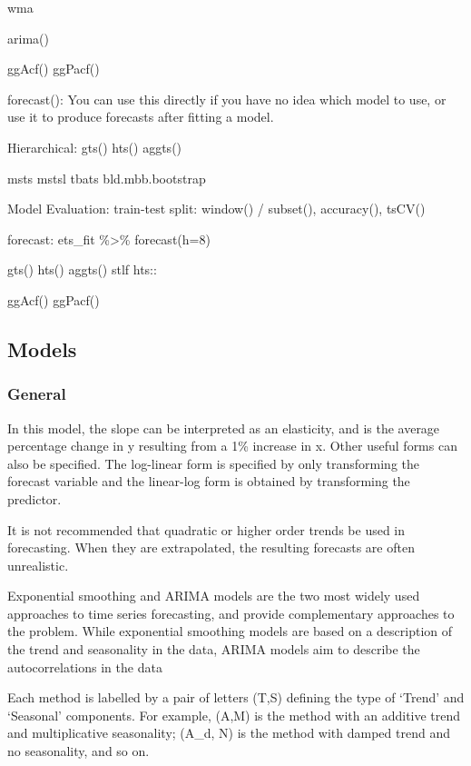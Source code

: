 \documentclass[]{book}
\begin{document}
wma

arima()

ggAcf() \textbar{} ggPacf()

forecast(): You can use this directly if you have no idea which model to
use, or use it to produce forecasts after fitting a model.

Hierarchical: gts() \textbar{} hts() \textbar{} aggts()

msts \textbar{} mstsl \textbar{} tbats \textbar{} bld.mbb.bootstrap

Model Evaluation: train-test split: window() / subset(), accuracy(),
tsCV()

forecast: ets\_fit \%\textgreater{}\% forecast(h=8)

gts() \textbar{} hts() \textbar{} aggts() \textbar{} stlf \textbar{}
hts::

ggAcf() \textbar{} ggPacf()

\subsection{Models}\label{models}

\subsubsection{General}\label{general-8}

In this model, the slope can be interpreted as an elasticity, and is the
average percentage change in y resulting from a 1\% increase in x. Other
useful forms can also be specified. The log-linear form is specified by
only transforming the forecast variable and the linear-log form is
obtained by transforming the predictor.

It is not recommended that quadratic or higher order trends be used in
forecasting. When they are extrapolated, the resulting forecasts are
often unrealistic.

Exponential smoothing and ARIMA models are the two most widely used
approaches to time series forecasting, and provide complementary
approaches to the problem. While exponential smoothing models are based
on a description of the trend and seasonality in the data, ARIMA models
aim to describe the autocorrelations in the data

Each method is labelled by a pair of letters (T,S) defining the type of
`Trend' and `Seasonal' components. For example, (A,M) is the method with
an additive trend and multiplicative seasonality; (A\_d, N) is the
method with damped trend and no seasonality, and so on.
\end{document}

